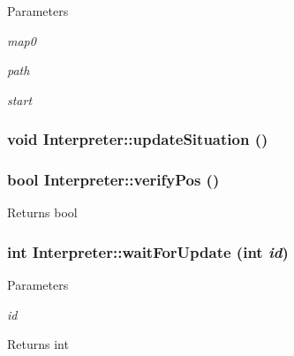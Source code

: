 \begin{DoxyParams}{Parameters}
\item[{\em map0}]\item[{\em path}]\item[{\em start}]\end{DoxyParams}
\hypertarget{classInterpreter_a9b1dfdf67300251fb2c22f37e1d4c646}{
\subsubsection[{updateSituation}]{\setlength{\rightskip}{0pt plus 5cm}void Interpreter::updateSituation ()}}
\label{classInterpreter_a9b1dfdf67300251fb2c22f37e1d4c646}
\hypertarget{classInterpreter_af8a7d8d22248eefd43de2ea08fc61b0f}{
\subsubsection[{verifyPos}]{\setlength{\rightskip}{0pt plus 5cm}bool Interpreter::verifyPos ()}}
\label{classInterpreter_af8a7d8d22248eefd43de2ea08fc61b0f}
\begin{DoxyReturn}{Returns}
bool 
\end{DoxyReturn}
\hypertarget{classInterpreter_ae09dee3df8e85f0d6b75b6dab5926850}{
\subsubsection[{waitForUpdate}]{\setlength{\rightskip}{0pt plus 5cm}int Interpreter::waitForUpdate (int {\em id})}}
\label{classInterpreter_ae09dee3df8e85f0d6b75b6dab5926850}

\begin{DoxyParams}{Parameters}
\item[{\em id}]\end{DoxyParams}
\begin{DoxyReturn}{Returns}
int 
\end{DoxyReturn}


